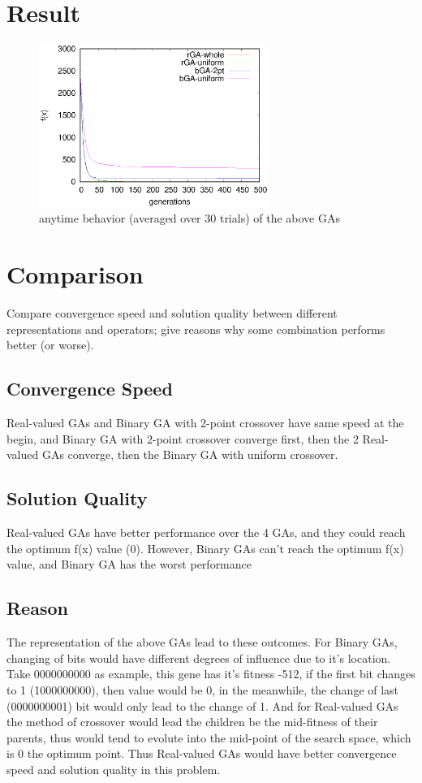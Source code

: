 ﻿\documentclass[conference]{IEEEtran}
\begin{document}
\begin{CJK}{UTF8}{bsmi}
\section{Result}

\begin{figure}[htbp]
\centerline{\includegraphics[width=7.5cm]{fig/cmp4GA/4GAs.eps}}
\caption{anytime behavior (averaged over 30 trials) of the above GAs}
\label{fig}
\end{figure}

\section{Comparison}
Compare convergence speed and solution quality between different representations and operators; give reasons why some combination performs better (or worse).

\subsection{Convergence Speed}
Real-valued GAs and Binary GA with 2-point crossover have same speed at the begin, and Binary GA with 2-point crossover converge first, then the 2 Real-valued GAs converge, then the Binary GA with uniform crossover.

\subsection{Solution Quality}
Real-valued GAs have better performance over the 4 GAs, and they could reach the optimum f(x) value (0). However, Binary GAs can't reach the optimum f(x) value, and Binary GA has the worst performance

\subsection{Reason}
The representation of the above GAs lead to these outcomes. For Binary GAs, changing of bits would have different degrees of influence due to it's location. Take 0000000000 as example, this gene has it's fitness -512, if the first bit changes to 1 (1000000000), then value would be 0, in the meanwhile, the change of last (0000000001) bit would only lead to the change of 1. And for Real-valued GAs the method of crossover would lead the children be the mid-fitness of their parents, thus would tend to evolute into the mid-point of the search space, which is 0 the optimum point. Thus Real-valued GAs would have better convergence speed and solution quality in this problem.


\end{CJK}
\end{document}
